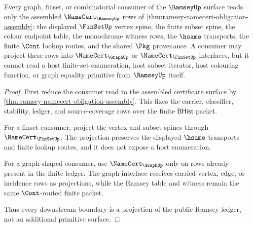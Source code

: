 \begin{theorem}
\label{thm:ramsey-downstream-boundary}
Every graph, finset, or combinatorial consumer of the $\RamseyUp$ surface reads
only the assembled $\NameCert_{\RamseyUp}$ rows of
\autoref{thm:ramsey-namecert-obligation-assembly}: the displayed
$\FinSetUp$ vertex spine, the finite subset spine, the colour endpoint table,
the monochrome witness rows, the $\hsame$ transports, the finite $\Cont$
lookup routes, and the shared $\Pkg$ provenance. A consumer may project these
rows into $\NameCert_{\GraphUp}$ or $\NameCert_{\FinSetUp}$ interfaces, but it
cannot read a host finite-set enumeration, host subset iterator, host colouring
function, or graph equality primitive from $\RamseyUp$ itself.
\end{theorem}
\begin{proof}
First reduce the consumer read to the assembled certificate surface by
\autoref{thm:ramsey-namecert-obligation-assembly}. This fixes the carrier,
classifier, stability, ledger, and source-coverage rows over the finite
$\mathsf{BHist}$ packet.

For a finset consumer, project the vertex and subset spines through
$\NameCert_{\FinSetUp}$. The projection preserves the displayed $\hsame$
transports and finite lookup routes, and it does not expose a host
enumeration.

For a graph-shaped consumer, use $\NameCert_{\GraphUp}$ only on rows already
present in the finite ledger. The graph interface receives carried vertex,
edge, or incidence rows as projections, while the Ramsey table and witness
remain the same $\Cont$-routed finite packet.

Thus every downstream boundary is a projection of the public Ramsey ledger,
not an additional primitive surface.
\end{proof}

